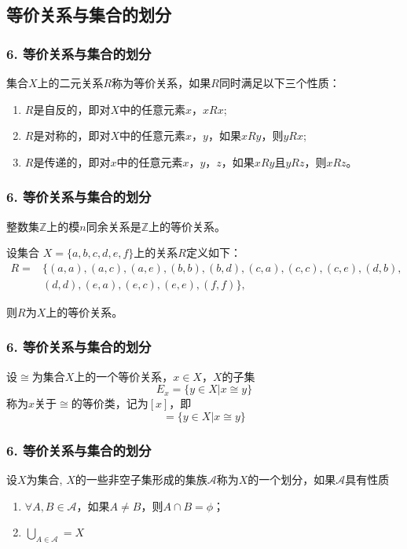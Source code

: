 \documentclass{beamer}
\begin{document}
\begin{CJK*}{UTF8}{gbsn}
\section{等价关系与集合的划分}
\begin{frame}
  \frametitle{6. 等价关系与集合的划分}
  \begin{Def}
    集合$X$上的二元关系$R$称为\alert{等价关系}，如果$R$同时满足以下三个性质：
    \begin{enumerate}[(1)]
    \item $R$是自反的，即对$X$中的任意元素$x$，$xRx$;
    \item $R$是对称的，即对$X$中的任意元素$x$，$y$，如果$xRy$，则$yRx$;
    \item $R$是传递的，即对$x$中的任意元素$x$，$y$，$z$，如果$xRy$且$yRz$，则$xRz$。
    \end{enumerate}
  \end{Def}
\end{frame}
\begin{frame}
  \frametitle{6. 等价关系与集合的划分}
  \begin{Ex}
    整数集$\mathbb{Z}$上的模$n$同余关系是$\mathbb{Z}$上的等价关系。
  \end{Ex}\pause
  \begin{Ex}
    设集合
    $X=\{a,b,c,d,e,f \}$上的关系$R$定义如下：
    \begin{align*}
      R=&\{(a,a),(a,c),(a,e),(b,b),(b,d),(c,a),(c,c),(c,e),(d,b),\\
      &(d,d),(e,a),(e,c),(e,e),(f,f)\},
    \end{align*}
  \end{Ex}
  则$R$为$X$上的等价关系。
\end{frame}
\begin{frame}
  \frametitle{6. 等价关系与集合的划分}
  \begin{Def}
    设$\cong$为集合$X$上的一个等价关系，$x\in X$，$X$的子集
    \[E_x=\{y\in X | x \cong y\}\]称为$x$关于$\cong$的\alert{等价类}，记为$[x]$，即
    \begin{equation*}
      [x] = \{y \in X | x \cong y\}
    \end{equation*}
  \end{Def}
\end{frame}
\begin{frame}
  \frametitle{6. 等价关系与集合的划分}
  \begin{Def}
    设$X$为集合, $X$的一些非空子集形成的集族$\mathscr{A}$称为$X$的一个划分，如果$\mathscr{A}$具有性质
    \begin{enumerate}
    \item $\forall A, B \in \mathscr{A}$，如果$A \neq B$，则$A \cap B = \phi$；
      \item $\bigcup_{A \in \mathscr{A}} = X$
    \end{enumerate}
  \end{Def}
\end{frame}


\end{CJK*}
\end{document}
